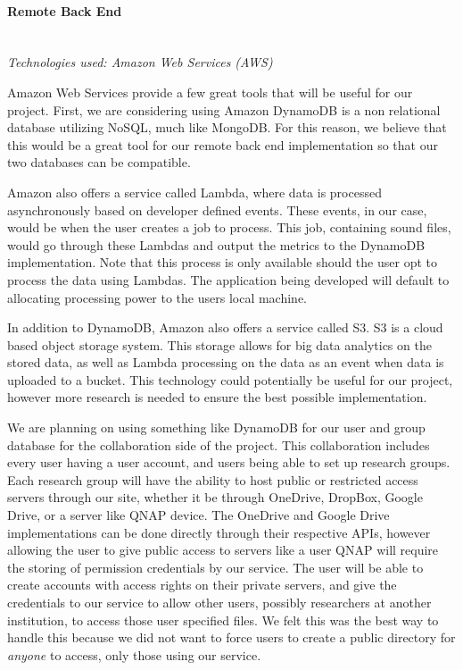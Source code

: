 \paragraph{Remote Back End} \mbox{} \\
\textit{Technologies used: Amazon Web Services (AWS)}\par
Amazon Web Services provide a few great tools that will be useful for our project. First, we are considering using Amazon DynamoDB is a non relational database utilizing NoSQL, much like MongoDB. For this reason, we believe that this would be a great tool for our remote back end implementation so that our two databases can be compatible.\par
Amazon also offers a service called Lambda, where data is processed asynchronously based on developer defined events. These events, in our case, would be when the user creates a job to process. This job, containing sound files, would go through these Lambdas and output the metrics to the DynamoDB implementation. Note that this process is only available should the user opt to process the data using Lambdas. The application being developed will default to allocating processing power to the user\textquotesingle s local machine.\par
In addition to DynamoDB, Amazon also offers a service called S3. S3 is a cloud based object storage system. This storage allows for big data analytics on the stored data, as well as Lambda processing on the data as an event when data is uploaded to a bucket. This technology could potentially be useful for our project, however more research is needed to ensure the best possible implementation.\par
We are planning on using something like DynamoDB for our user and group database for the collaboration side of the project. This collaboration includes every user having a user account, and users being able to set up research groups. Each research group will have the ability to host public or restricted access servers through our site, whether it be through OneDrive, DropBox, Google Drive, or a server like QNAP device. The OneDrive and Google Drive implementations can be done directly through their respective APIs, however allowing the user to give public access to servers like a user QNAP will require the storing of permission credentials by our service. The user will be able to create accounts with access rights on their private servers, and give the credentials to our service to allow other users, possibly researchers at another institution, to access those user specified files. We felt this was the best way to handle this because we did not want to force users to create a public directory for \textit{anyone} to access, only those using our service.\par
\newpage